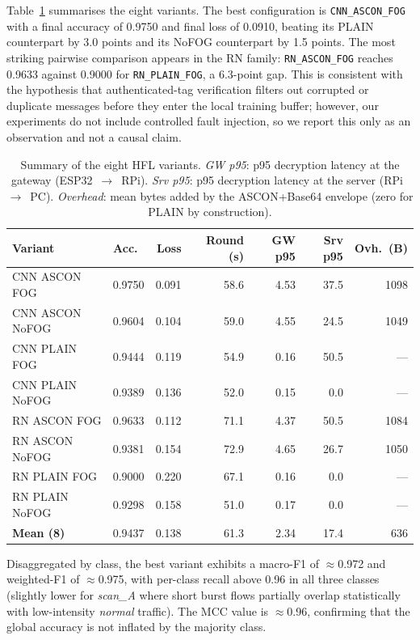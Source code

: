 \documentclass[runningheads]{llncs}
\begin{document}
Table~\ref{tab:variants_results} summarises the eight variants. The best
configuration is \texttt{CNN\_ASCON\_FOG} with a final accuracy of 0.9750
and final loss of 0.0910, beating its PLAIN counterpart by 3.0 points and
its NoFOG counterpart by 1.5 points. The most striking pairwise comparison
appears in the RN family: \texttt{RN\_ASCON\_FOG} reaches 0.9633 against
0.9000 for \texttt{RN\_PLAIN\_FOG}, a 6.3-point gap. This is consistent
with the hypothesis that authenticated-tag verification filters out
corrupted or duplicate messages before they enter the local training
buffer; however, our experiments do not include controlled fault
injection, so we report this only as an observation and not a causal
claim.

\begin{table}[t]
\centering
\caption{Summary of the eight HFL variants. \textit{GW p95}: p95
decryption latency at the gateway (ESP32~$\rightarrow$~RPi).
\textit{Srv p95}: p95 decryption latency at the server
(RPi~$\rightarrow$~PC). \textit{Overhead}: mean bytes added by the
ASCON+Base64 envelope (zero for PLAIN by construction).}
\label{tab:variants_results}
\small
\begin{tabular}{@{}lrrrrrr@{}}
\toprule
Variant & Acc.\ & Loss & Round (s) & GW p95 & Srv p95 & Ovh.\ (B) \\
\midrule
CNN ASCON FOG    & 0.9750 & 0.091 & 58.6 & 4.53 & 37.5 & 1098 \\
CNN ASCON NoFOG  & 0.9604 & 0.104 & 59.0 & 4.55 & 24.5 & 1049 \\
CNN PLAIN FOG    & 0.9444 & 0.119 & 54.9 & 0.16 & 50.5 & ---  \\
CNN PLAIN NoFOG  & 0.9389 & 0.136 & 52.0 & 0.15 &  0.0 & ---  \\
RN ASCON FOG     & 0.9633 & 0.112 & 71.1 & 4.37 & 50.5 & 1084 \\
RN ASCON NoFOG   & 0.9381 & 0.154 & 72.9 & 4.65 & 26.7 & 1050 \\
RN PLAIN FOG     & 0.9000 & 0.220 & 67.1 & 0.16 &  0.0 & ---  \\
RN PLAIN NoFOG   & 0.9298 & 0.158 & 51.0 & 0.17 &  0.0 & ---  \\
\midrule
\textbf{Mean (8)} & 0.9437 & 0.138 & 61.3 & 2.34 & 17.4 & 636 \\
\bottomrule
\end{tabular}
\end{table}

Disaggregated by class, the best variant exhibits a macro-F1 of
$\approx$0.972 and weighted-F1 of $\approx$0.975, with per-class recall
above 0.96 in all three classes (slightly lower for \emph{scan\_A} where
short burst flows partially overlap statistically with low-intensity
\emph{normal} traffic). The MCC value is $\approx$0.96, confirming that
the global accuracy is not inflated by the majority class.
\end{document}
